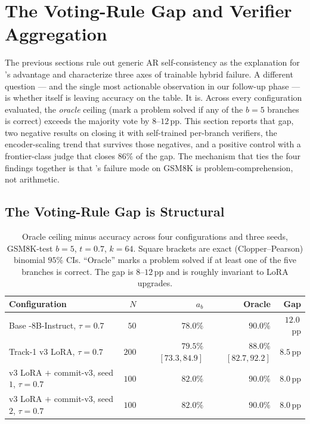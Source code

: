 \section{The Voting-Rule Gap and Verifier Aggregation}
\label{sec:voting_gap}

The previous sections rule out generic AR self-consistency as the
explanation for \LLaDA{}'s \cmaj{} advantage and characterize three
axes of trainable hybrid failure.  A different question --- and the
single most actionable observation in our follow-up phase --- is
whether \cmaj{} itself is leaving accuracy on the table.  It is.
Across every \cmaj{} configuration evaluated, the \emph{oracle}
ceiling (mark a problem solved if any of the $b{=}5$ branches is
correct) exceeds the \cmaj{} majority vote by $8\text{--}12$\,pp.
This section reports that gap, two negative results on closing it
with self-trained per-branch verifiers, the encoder-scaling trend
that survives those negatives, and a positive control with a
frontier-class judge that closes $86\%$ of the gap.  The mechanism
that ties the four findings together is that \LLaDA{}'s failure mode
on GSM8K is problem-comprehension, not arithmetic.

\subsection{The Voting-Rule Gap is Structural}
\label{subsec:voting_gap_headline}

\begin{table}[h]
\centering
\caption{Oracle ceiling minus \cmaj{} accuracy across four
configurations and three seeds, GSM8K-test $b{=}5$, $t{=}0.7$,
$k{=}64$.  Square brackets are exact (Clopper--Pearson) binomial
$95\%$ CIs.  ``Oracle'' marks a problem solved if at least one of
the five branches is correct.  The gap is $8\text{--}12$\,pp and is
roughly invariant to LoRA upgrades.}
\label{tab:voting_gap}
\smallskip
\small
\begin{tabular}{lrrrr}
\toprule
Configuration & $N$ & \cmaj{} $a_b$ & Oracle & Gap \\
\midrule
Base \LLaDA{}-8B-Instruct, $\tau{=}0.7$ & $50$ & $78.0\%$ & $90.0\%$ & $12.0$\,pp \\
Track-1 v3 LoRA, $\tau{=}0.7$ & $200$ &
  $79.5\%$ \mbox{$[73.3, 84.9]$} & $88.0\%$ \mbox{$[82.7, 92.2]$} & $8.5$\,pp \\
v3 LoRA $+$ commit-v3, seed $1$, $\tau{=}0.7$ & $100$ & $82.0\%$ & $90.0\%$ & $8.0$\,pp \\
v3 LoRA $+$ commit-v3, seed $2$, $\tau{=}0.7$ & $100$ & $82.0\%$ & $90.0\%$ & $8.0$\,pp \\
\bottomrule
\end{tabular}
\normalsize
\end{table}

